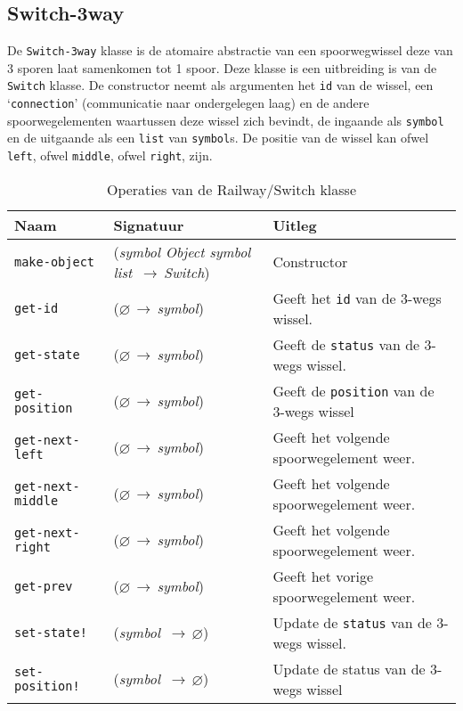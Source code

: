\documentclass[a4paper, 11pt]{article}
\newcommand{\naar}{\,$\rightarrow$\,}
\renewcommand{\empty}{$\varnothing$}
\newcommand{\<}{\scriptsize\textless\normalsize}
\renewcommand{\>}{\scriptsize\textgreater\normalsize}
\begin{document}
\newpage

\subsection{Switch-3way} %
De \texttt{Switch-3way} klasse is de atomaire abstractie van een spoorwegwissel deze van 3 sporen laat samenkomen tot 1 spoor. Deze klasse is een uitbreiding is van de \texttt{Switch} klasse. De constructor neemt als argumenten het \texttt{id} van de wissel, een \lq\texttt{connection}' (communicatie naar ondergelegen laag) en de andere spoorwegelementen waartussen deze wissel zich bevindt, de ingaande als \texttt{symbol} en de uitgaande als een \texttt{list} van \texttt{symbol}s. De positie van de wissel kan ofwel \texttt{left}, ofwel \texttt{middle}, ofwel \texttt{right}, zijn.
\begin{table}[H]
	\begin{center}
		{
		\begin{tabular}{|l l l|}
			\hline
			\textbf{Naam} & \textbf{Signatuur} & \textbf{Uitleg}\\
			\hline
			\texttt{make-object} & (\textit{symbol Object symbol list} \naar \textit{Switch}) & Constructor\\
			\hline
			\texttt{get-id} & (\empty \naar \textit{symbol}) & Geeft het \texttt{id} van de 3-wegs wissel.\\
			\texttt{get-state} & (\empty \naar \textit{symbol}) & Geeft de \texttt{status} van de 3-wegs wissel.\\
			\texttt{get-position} & (\empty \naar \textit{symbol}) & Geeft de \texttt{position} van de 3-wegs wissel\\
			\texttt{get-next-left} & (\empty \naar \textit{symbol}) & Geeft het volgende spoorwegelement weer.\\
			\texttt{get-next-middle} & (\empty \naar \textit{symbol}) & Geeft het volgende spoorwegelement weer.\\
			\texttt{get-next-right} & (\empty \naar \textit{symbol}) & Geeft het volgende spoorwegelement weer.\\
			\texttt{get-prev} & (\empty \naar \textit{symbol}) & Geeft het vorige spoorwegelement weer.\\
			\texttt{set-state!} & (\textit{symbol} \naar \empty) & Update de \texttt{status} van de 3-wegs wissel.\\
			\texttt{set-position!} & (\textit{symbol} \naar \empty) & Update de status van de 3-wegs wissel\\
			\hline
		\end{tabular}}
		\caption{Operaties van de Railway/Switch klasse}
	\end{center}
\end{table}
\end{document}
